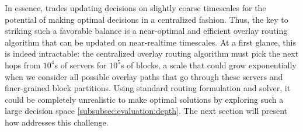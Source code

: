 In essence, \name trades updating decisions on slightly coarse timescales
for the potential of making optimal decisions in a centralized
fashion.
Thus, the key to striking such a favorable balance is a
near-optimal and efficient overlay routing
algorithm that can be updated on near-realtime timescales.
At a first glance, this is indeed intractable:
the centralized overlay routing algorithm must pick the next hops
from $10^4$s of servers for $10^5$s of blocks, a scale that could
grow exponentially when we consider all possible
overlay paths that go through these servers and finer-grained block partitions.
Using standard routing formulation and solver, it could be completely unrealistic to make optimal solutions by exploring such a large decision space \Section\ref{subsubsec:evaluation:depth}.
The next section will present how \name addresses this challenge.


%
%
%
%
%
%



